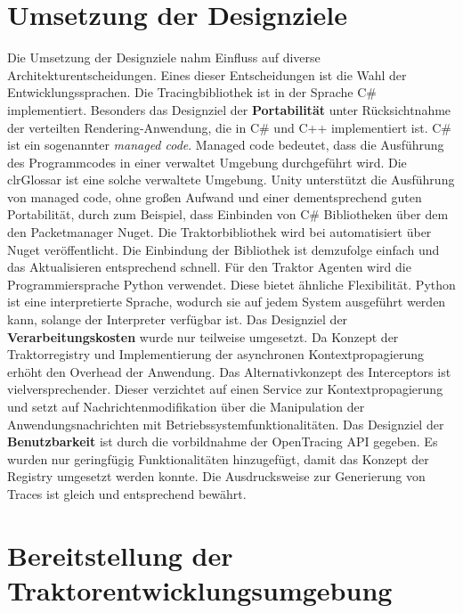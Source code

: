 \section{Umsetzung der Designziele}
\label{section:Umsetzung der Designziele}

Die Umsetzung der Designziele nahm Einfluss auf diverse Architekturentscheidungen. Eines dieser Entscheidungen ist die Wahl der Entwicklungssprachen. Die Tracingbibliothek ist in der Sprache C\# implementiert. Besonders das Designziel der \textbf{Portabilität} unter Rücksichtnahme der verteilten Rendering-Anwendung, die in C\# und C++ implementiert ist. C\# ist ein sogenannter \emph{managed code}. Managed code bedeutet, dass die Ausführung des Programmcodes in einer verwaltet Umgebung durchgeführt wird. Die \gls{clrGlossar} ist eine solche verwaltete Umgebung. Unity unterstützt die Ausführung von managed code, ohne großen Aufwand und einer dementsprechend guten Portabilität, durch zum Beispiel, dass Einbinden von C\# Bibliotheken über dem den Packetmanager Nuget. Die Traktorbibliothek wird bei automatisiert über Nuget veröffentlicht. Die Einbindung der Bibliothek ist demzufolge einfach und das Aktualisieren entsprechend schnell. Für den Traktor Agenten wird die Programmiersprache Python verwendet. Diese bietet ähnliche Flexibilität. Python ist eine interpretierte Sprache, wodurch sie auf jedem System ausgeführt werden kann, solange der Interpreter verfügbar ist.
Das Designziel der \textbf{Verarbeitungskosten} wurde nur teilweise umgesetzt. Da Konzept der Traktorregistry und Implementierung der asynchronen Kontextpropagierung erhöht den Overhead der Anwendung. Das Alternativkonzept des Interceptors ist vielversprechender. Dieser verzichtet auf einen Service zur Kontextpropagierung und setzt auf Nachrichtenmodifikation über die Manipulation der Anwendungsnachrichten mit Betriebssystemfunktionalitäten. Das Designziel der \textbf{Benutzbarkeit} ist durch die vorbildnahme der OpenTracing API gegeben. Es wurden nur geringfügig Funktionalitäten hinzugefügt, damit das Konzept der Registry umgesetzt werden konnte. Die Ausdrucksweise zur Generierung von Traces ist gleich und entsprechend bewährt.



\section{Bereitstellung der Traktorentwicklungsumgebung}
\label{section:Bereitstellung der Traktorentwicklungsumgebung}

